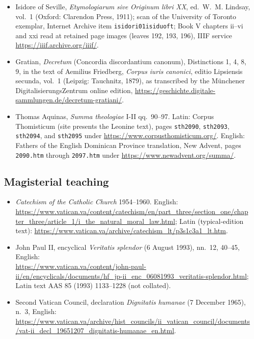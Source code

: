 \begin{itemize}
\item Isidore of Seville, \emph{Etymologiarum sive Originum libri XX}, ed.\ W.~M. Lindsay, vol.~1 (Oxford: Clarendon Press, 1911); scan of the University of Toronto exemplar, Internet Archive item \texttt{isidori01isiduoft}; Book V chapters ii--vi and xxi read at retained page images (leaves 192, 193, 196), IIIF service \url{https://iiif.archive.org/iiif/}.
\item Gratian, \emph{Decretum} (Concordia discordantium canonum), Distinctions 1, 4, 8, 9, in the text of Aemilius Friedberg, \emph{Corpus iuris canonici}, editio Lipsiensis secunda, vol.~1 (Leipzig: Tauchnitz, 1879), as transcribed by the M\"unchener DigitalisierungsZentrum online edition, \url{https://geschichte.digitale-sammlungen.de/decretum-gratiani/}.
\item Thomas Aquinas, \emph{Summa theologiae} I-II qq.~90--97. Latin: Corpus Thomisticum (site presents the Leonine text), pages \texttt{sth2090}, \texttt{sth2093}, \texttt{sth2094}, and \texttt{sth2095} under \url{https://www.corpusthomisticum.org/}. English: Fathers of the English Dominican Province translation, New Advent, pages \texttt{2090.htm} through \texttt{2097.htm} under \url{https://www.newadvent.org/summa/}.
\end{itemize}

\subsection*{Magisterial teaching}

\begin{itemize}
\item \emph{Catechism of the Catholic Church} 1954--1960. English: \url{https://www.vatican.va/content/catechism/en/part_three/section_one/chapter_three/article_1/i_the_natural_moral_law.html}; Latin (typical-edition text): \url{https://www.vatican.va/archive/catechism_lt/p3s1c3a1_lt.htm}.
\item John Paul II, encyclical \emph{Veritatis splendor} (6 August 1993), nn.~12, 40--45, English:\\ \url{https://www.vatican.va/content/john-paul-ii/en/encyclicals/documents/hf_jp-ii_enc_06081993_veritatis-splendor.html}; Latin text AAS 85 (1993) 1133--1228 (not collated).
\item Second Vatican Council, declaration \emph{Dignitatis humanae} (7 December 1965), n.~3, English: \url{https://www.vatican.va/archive/hist_councils/ii_vatican_council/documents/vat-ii_decl_19651207_dignitatis-humanae_en.html}.
\end{itemize}

